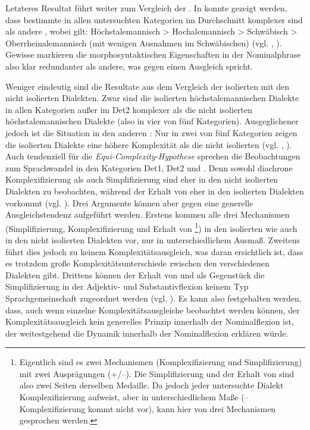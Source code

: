 Letzteres Resultat führt weiter zum Vergleich der . In \linebreak konnte gezeigt werden, dass bestimmte  in allen untersuchten Kategorien im Durchschnitt komplexer sind als andere , wobei gilt: Höchstalemannisch > Hochalemannisch > Schwäbisch > Oberrheinalemannisch (mit wenigen Ausnahmen im Schwäbischen) (vgl. , ). Gewisse  markieren die morphosyntaktischen Eigenschaften in der Nominalphrase also klar redundanter als andere, was gegen einen Ausgleich spricht.

Weniger eindeutig sind die Resultate aus dem Vergleich der isolierten mit den nicht isolierten Dialekten. Zwar sind die isolierten höchstalemannischen Dialekte in allen Kategorien außer im Det2 komplexer als die nicht isolierten höchstalemannischen Dialekte (also in vier von fünf Kategorien). Ausgeglichener jedoch ist die Situation in den anderen : Nur in zwei von fünf Kategorien zeigen die isolierten Dialekte eine höhere Komplexität als die nicht isolierten (vgl. , ). Auch tendenziell für die \textit{Equi-Com\-ple\-xi\-ty-Hy\-po\-the\-se} sprechen die Beobachtungen zum Sprachwandel in den Kategorien Det1, Det2 und . Denn sowohl diachrone Komplexifizierung als auch Simplifizierung sind eher in den nicht isolierten Dialekten zu beobachten, während der Erhalt von  eher in den isolierten Dialekten vorkommt (vgl. ). Drei Argumente können aber gegen eine generelle Ausgleichstendenz aufgeführt werden. Erstens kommen alle drei Mechanismen (Simplifizierung, Komplexifizierung und Erhalt von \footnote{Eigentlich sind es zwei Mechanismen (Komplexifizierung und Simplifizierung) mit zwei Ausprägungen (+/–). Die Simplifizierung und der Erhalt von  sind also zwei Seiten derselben Medaille. Da jedoch jeder untersuchte Dialekt Komplexifizierung aufweist, aber in unterschiedlichem Maße (–Komplexifizierung kommt nicht vor), kann hier von drei Mechanismen gesprochen werden.}) in den isolierten wie auch in den nicht isolierten Dialekten vor, nur in unterschiedlichem Ausmaß. Zweitens führt dies jedoch zu keinem Komplexitätsausgleich, was daran ersichtlich ist, dass es trotzdem große Komplexitätsunterschiede zwischen den verschiedenen Dialekten gibt. Drittens können der Erhalt von  und als Gegenstück die Simplifizierung in der Adjektiv- und Substantivflexion keinem Typ Sprachgemeinschaft zugeordnet werden (vgl. ). Es kann also festgehalten werden, dass, auch wenn einzelne Komplexitätsausgleiche beobachtet werden können, der Komplexitätsausgleich kein generelles Prinzip innerhalb der Nominalflexion ist, der weitestgehend die Dynamik innerhalb der Nominalflexion erklären würde.

